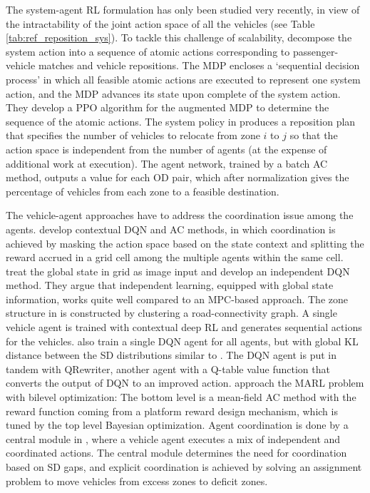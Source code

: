 \documentclass{article}
\begin{document}
The system-agent RL formulation has only been studied very recently, in view of the intractability of the joint action space of all the vehicles (see Table \ref{tab:ref_reposition_sys}). To tackle this challenge of scalability, \cite{feng2020scalable} decompose the system action into a sequence of atomic actions corresponding to passenger-vehicle matches and vehicle repositions. The MDP encloses a `sequential decision process' in which all feasible atomic actions are executed to represent one system action, and the MDP advances its state upon complete of the system action. They develop a PPO algorithm for the augmented MDP to determine the sequence of the atomic actions. The system policy in \citep{mao2020dispatch} produces a reposition plan that specifies the number of vehicles to relocate from zone $i$ to $j$ so that the action space is independent from the number of agents (at the expense of additional work at execution). The agent network, trained by a batch AC method, outputs a value for each OD pair, which after normalization gives the percentage of vehicles from each zone to a feasible destination. 

The vehicle-agent approaches have to address the coordination issue among the agents. 
\cite{lin2018efficient} develop contextual DQN and AC methods, in which coordination is achieved by masking the action space based on the state context and splitting the reward accrued in a grid cell among the multiple agents within the same cell. 
\cite{oda2018movi} treat the global state in grid as image input and develop an independent DQN method. They argue that independent learning, equipped with global state information, works quite well compared to an MPC-based approach.
The zone structure in \citep{liu2020context} is constructed by clustering a road-connectivity graph. A single vehicle agent is trained with contextual deep RL and generates sequential actions for the vehicles.
\cite{zhang2020dynamic} also train a single DQN agent for all agents, but with global KL distance between the SD distributions similar to \citep{zhou2019multi}. The DQN agent is put in tandem with QRewriter, another agent with a Q-table value function that converts the output of DQN to an improved action.
\cite{shou2020reward} approach the MARL problem with bilevel optimization: The bottom level is a mean-field AC method \citep{li2019efficient} with the reward function coming from a platform reward design mechanism, which is tuned by the top level Bayesian optimization.
Agent coordination is done by a central module in \citep{chaudhari2020learn}, where a vehicle agent executes a mix of independent and coordinated actions. The central module determines the need for coordination based on SD gaps, and explicit coordination is achieved by solving an assignment problem to move vehicles from excess zones to deficit zones.
\end{document}
